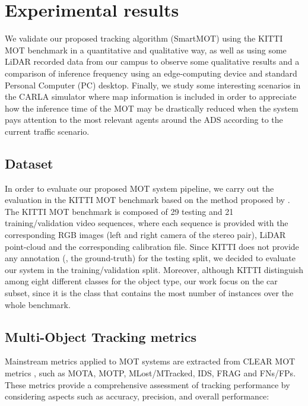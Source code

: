 \section{Experimental results}
\label{sec:4_mot}

We validate our proposed tracking algorithm (SmartMOT) using the KITTI \ac{MOT} benchmark \cite{geiger2012we} in a quantitative and qualitative way, as well as using some \ac{LiDAR} recorded data from our campus to observe some qualitative results and a comparison of inference frequency using an edge-computing device and standard Personal Computer (PC) desktop. Finally, we study some interesting scenarios in the \ac{CARLA} simulator where map information is included in order to appreciate how the inference time of the \ac{MOT} may be drastically reduced when the system pays attention to the most relevant agents around the \ac{ADS} according to the current traffic scenario. 


\subsection{Dataset}
\label{subsec:4_mot_dataset}

In order to evaluate our proposed \ac{MOT} system pipeline, we carry out the evaluation in the KITTI \ac{MOT} benchmark \cite{geiger2012we} based on the method proposed by \cite{weng20203d}. The KITTI \ac{MOT} benchmark is composed of 29 testing and 21 training/validation video sequences, where each sequence is provided with the corresponding RGB images (left and right camera of the stereo pair), \ac{LiDAR} point-cloud and the corresponding calibration file. Since KITTI does not provide any annotation (\ie, the ground-truth) for the testing split, we decided to evaluate our system in the training/validation split. Moreover, although KITTI distinguish among eight different classes for the object type, our work focus on the car subset, since it is the class that contains the most number of instances over the whole benchmark.

\subsection{Multi-Object Tracking metrics}
\label{subsec:4_mot_metrics}

Mainstream metrics applied to MOT systems are extracted from CLEAR \ac{MOT} metrics \cite{bernardin2008evaluating}, such as \acf{MOTA}, \acf{MOTP}, \acf{MLost}/\acf{MTracked}, \ac{IDS}, \ac{FRAG} and \acp{FN}/\acp{FP}. These metrics provide a comprehensive assessment of tracking performance by considering aspects such as accuracy, precision, and overall performance:

